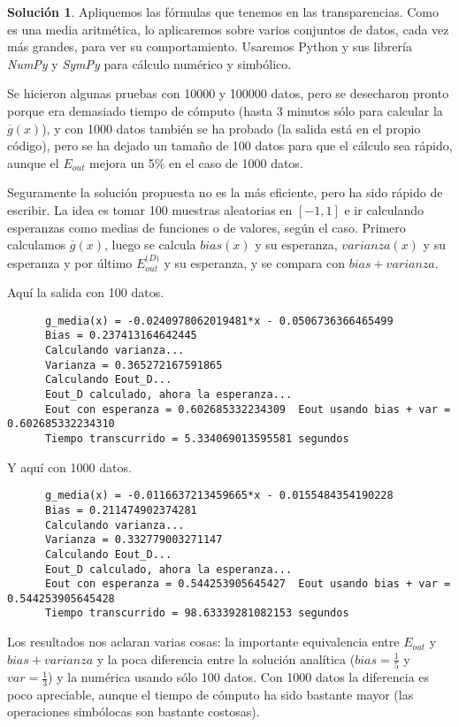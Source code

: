 \documentclass[a4paper, 11pt]{article}
\theoremstyle{definition}
\newtheorem*{solucion}{Solución}
\begin{document}
  \begin{solucion}
    Apliquemos las fórmulas que tenemos en las transparencias. Como es una media aritmética, lo aplicaremos sobre varios conjuntos de datos, cada vez más grandes, para ver su comportamiento. Usaremos Python y sus librería \emph{NumPy} y \emph{SymPy} para cálculo numérico y simbólico.

    Se hicieron algunas pruebas con 10000 y 100000 datos, pero se desecharon pronto porque era demasiado tiempo de cómputo (hasta 3 minutos sólo para calcular la $\overline{g}(x)$), y con 1000 datos también se ha probado (la salida está en el propio código), pero se ha dejado un tamaño de 100 datos para que el cálculo sea rápido, aunque el $E_{out}$ mejora un 5\% en el caso de 1000 datos.

    Seguramente la solución propuesta no es la más eficiente, pero ha sido rápido de escribir. La idea es tomar 100 muestras aleatorias en $[-1,1]$ e ir calculando esperanzas como medias de funciones o de valores, según el caso. Primero calculamos $\overline{g}(x)$, luego se calcula $bias(x)$ y su esperanza, $varianza(x)$ y su esperanza y por último $E_{out}^{\mathcal(D)}$ y su esperanza, y se compara con $bias+varianza$.

    

    Aquí la salida con 100 datos.

    \begin{verbatim}
      g_media(x) = -0.0240978062019481*x - 0.0506736366465499
      Bias = 0.237413164642445
      Calculando varianza...
      Varianza = 0.365272167591865
      Calculando Eout_D...
      Eout_D calculado, ahora la esperanza...
      Eout con esperanza = 0.602685332234309  Eout usando bias + var = 0.602685332234310
      Tiempo transcurrido = 5.334069013595581 segundos
    \end{verbatim}


    Y aquí con 1000 datos.

    \begin{verbatim}
      g_media(x) = -0.0116637213459665*x - 0.0155484354190228
      Bias = 0.211474902374281
      Calculando varianza...
      Varianza = 0.332779003271147
      Calculando Eout_D...
      Eout_D calculado, ahora la esperanza...
      Eout con esperanza = 0.544253905645427  Eout usando bias + var = 0.544253905645428
      Tiempo transcurrido = 98.63339281082153 segundos

    \end{verbatim}

    Los resultados nos aclaran varias cosas: la importante equivalencia entre $E_{out}$ y $bias+varianza$ y la poca diferencia entre la solución analítica ($bias=\frac{1}{5}$ y $var=\frac{1}{3}$) y la numérica usando sólo 100 datos. Con 1000 datos la diferencia es poco apreciable, aunque el tiempo de cómputo ha sido bastante mayor (las operaciones simbólocas son bastante costosas).

  \end{solucion}
\end{document}
